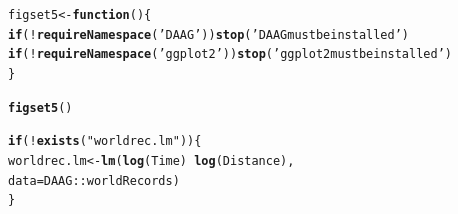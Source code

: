 \documentclass[12pt, a4paper,  BCOR=8.25mm, DIV=15]{scrartcl}\usepackage[]{graphicx}\usepackage[]{color}
\makeatletter
\newcommand{\hlstr}[1]{\textcolor[rgb]{0.192,0.494,0.8}{#1}}%
\newcommand{\hlopt}[1]{\textcolor[rgb]{0,0,0}{#1}}%
\newcommand{\hlstd}[1]{\textcolor[rgb]{0.345,0.345,0.345}{#1}}%
\newcommand{\hlkwa}[1]{\textcolor[rgb]{0.161,0.373,0.58}{\textbf{#1}}}%
\newcommand{\hlkwb}[1]{\textcolor[rgb]{0.69,0.353,0.396}{#1}}%
\newcommand{\hlkwc}[1]{\textcolor[rgb]{0.333,0.667,0.333}{#1}}%
\newcommand{\hlkwd}[1]{\textcolor[rgb]{0.737,0.353,0.396}{\textbf{#1}}}%
\newenvironment{kframe}{%
 \def\at@end@of@kframe{}%
 \ifinner\ifhmode%
  \def\at@end@of@kframe{\end{minipage}}%
  \begin{minipage}{\columnwidth}%
 \fi\fi%
 \def\FrameCommand##1{\hskip\@totalleftmargin \hskip-\fboxsep
 \colorbox{shadecolor}{##1}\hskip-\fboxsep
     \hskip-\linewidth \hskip-\@totalleftmargin \hskip\columnwidth}%
 \MakeFramed {\advance\hsize-\width
   \@totalleftmargin\z@ \linewidth\hsize
   \@setminipage}}%
 {\par\unskip\endMakeFramed%
 \at@end@of@kframe}
\newenvironment{knitrout}{}{} %
\makeatother
\begin{document}
\begin{knitrout}
\color{fgcolor}\begin{kframe}
\begin{alltt}
\hlstd{figset5} \hlkwb{<-} \hlkwa{function}\hlstd{()\{}
    \hlkwa{if}\hlstd{(}\hlopt{!}\hlkwd{requireNamespace}\hlstd{(}\hlstr{'DAAG'}\hlstd{))}\hlkwd{stop}\hlstd{(}\hlstr{'DAAG must be installed'}\hlstd{)}
  \hlkwa{if}\hlstd{(}\hlopt{!}\hlkwd{requireNamespace}\hlstd{(}\hlstr{'ggplot2'}\hlstd{))}\hlkwd{stop}\hlstd{(}\hlstr{'ggplot2 must be installed'}\hlstd{)}
  \hlstd{\}}
\end{alltt}
\end{kframe}
\end{knitrout}

\begin{knitrout}
\color{fgcolor}\begin{kframe}
\begin{alltt}
\hlkwd{figset5}\hlstd{()}
\end{alltt}


{\ttfamily\noindent\itshape\color{messagecolor}{Loading required namespace: DAAG}}

{\ttfamily\noindent\itshape\color{messagecolor}{Loading required namespace: ggplot2}}\begin{alltt}
\hlkwa{if}\hlstd{(}\hlopt{!}\hlkwd{exists}\hlstd{(}\hlstr{"worldrec.lm"}\hlstd{))\{}
    \hlstd{worldrec.lm} \hlkwb{<-} \hlkwd{lm}\hlstd{(}\hlkwd{log}\hlstd{(Time)} \hlopt{~} \hlkwd{log}\hlstd{(Distance),}
                      \hlkwc{data}\hlstd{=DAAG}\hlopt{::}\hlstd{worldRecords)}
\hlstd{\}}
\end{alltt}
\end{kframe}
\end{knitrout}
\end{document}

